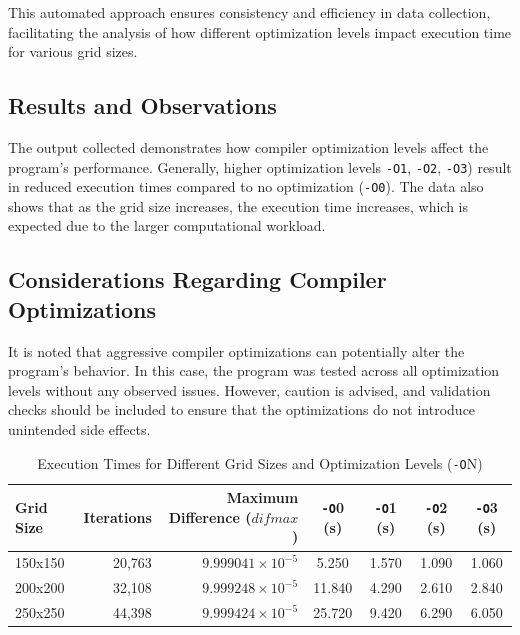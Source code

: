 \documentclass{article}
\begin{document}
This automated approach ensures consistency and efficiency in data collection, facilitating the analysis of how different optimization levels impact execution time for various grid sizes.

\subsection{Results and Observations}

The output collected demonstrates how compiler optimization levels affect the program's performance. Generally, higher optimization levels \texttt{-O1}, \texttt{-O2}, \texttt{-O3}) result in reduced execution times compared to no optimization (\texttt{-O0}). The data also shows that as the grid size increases, the execution time increases, which is expected due to the larger computational workload.

\subsection{Considerations Regarding Compiler Optimizations}

It is noted that aggressive compiler optimizations can potentially alter the program's behavior. In this case, the program was tested across all optimization levels without any observed issues. However, caution is advised, and validation checks should be included to ensure that the optimizations do not introduce unintended side effects.

\begin{table}[H]
    \centering
    \caption{Execution Times for Different Grid Sizes and Optimization Levels (\texttt{-O}N)}
    \label{tab:execution_times}
    \begin{tabular}{lrrcccc}
    \toprule
    \textbf{Grid Size} & \textbf{Iterations} & \textbf{Maximum Difference ($difmax$)} & \textbf{\texttt{-O}0 (s)} & \textbf{\texttt{-O}1 (s)} & \textbf{\texttt{-O}2 (s)} & \textbf{\texttt{-O}3 (s)} \\
    \midrule
    150x150 & 20,763 & $9.999041 \times 10^{-5}$ & 5.250 & 1.570 & 1.090 & 1.060 \\
    200x200 & 32,108 & $9.999248 \times 10^{-5}$ & 11.840 & 4.290 & 2.610 & 2.840 \\
    250x250 & 44,398 & $9.999424 \times 10^{-5}$ & 25.720 & 9.420 & 6.290 & 6.050 \\
    \bottomrule
    \end{tabular}
\end{table}
\end{document}
